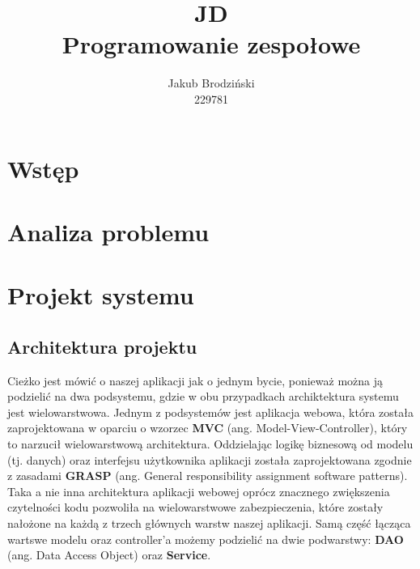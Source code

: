 \documentclass[a4paper]{article}
\title{\huge JD \\
	\large Programowanie zespołowe}
\author{Jakub Brodziński \\ 229781}
\date{}
\begin{document}
\maketitle
\pagebreak
\section{Wstęp}
\section{Analiza problemu}
\section{Projekt systemu}
\subsection{Architektura projektu}
Cieżko jest mówić o naszej aplikacji jak o jednym bycie, ponieważ można ją podzielić na dwa podsystemu, gdzie w obu przypadkach archiktektura systemu jest wielowarstwowa. Jednym z podsystemów jest aplikacja webowa, która została zaprojektowana w oparciu o wzorzec \textbf{MVC} (ang. Model-View-Controller), który to narzucił wielowarstwową architektura. Oddzielając logikę biznesową od modelu (tj. danych) oraz interfejsu użytkownika aplikacji została zaprojektowana zgodnie z zasadami \textbf{GRASP} (ang. General responsibility assignment software patterns). Taka a nie inna architektura aplikacji webowej oprócz znacznego zwiększenia czytelności kodu pozwoliła na wielowarstwowe zabezpieczenia, które zostały nałożone na każdą z trzech głównych warstw naszej aplikacji. Samą część łącząca wartswe modelu oraz controller'a możemy podzielić na dwie podwarstwy: \textbf{DAO} (ang. Data Access Object) oraz \textbf{Service}.
\end{document}
